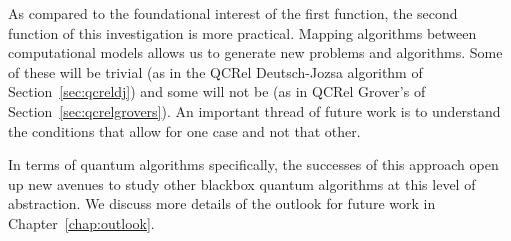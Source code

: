 As compared to the foundational interest of the first function, the second function of this investigation is more practical.  Mapping algorithms between computational models allows us to generate new problems and algorithms. Some of these will be trivial (as in the QCRel Deutsch-Jozsa algorithm of Section~\ref{sec:qcreldj}) and some will not be (as in QCRel Grover's of Section~\ref{sec:qcrelgrovers}). An important thread of future work is to understand the conditions that allow for one case and not that other.

In terms of quantum algorithms specifically, the successes of this approach open up new avenues to study other blackbox quantum algorithms at this level of abstraction. We discuss more details of the outlook for future work in Chapter~\ref{chap:outlook}. 


